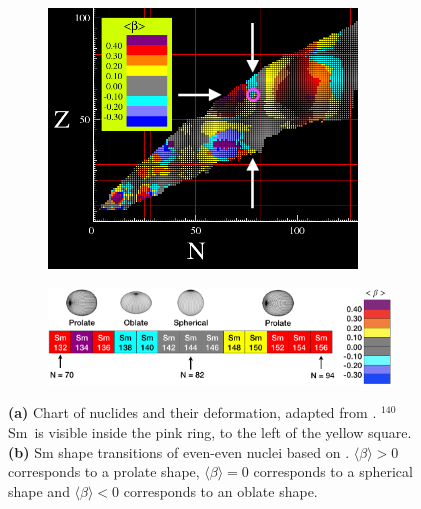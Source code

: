 \documentclass[twoside,english]{uiofysmaster/uiofysmaster}
\newcommand{\Sm}{$^{140}$Sm} %
\begin{document}
\begin{figure}[htb!]
	\centering
	\begin{subfigure}{\textwidth}
		\centering
		\includegraphics[width=0.9\textwidth]{Images/cea-CoN-adjusted.png}
		\caption{}
		\label{fig:cea_CoN}
	\end{subfigure}
	\begin{subfigure}{\textwidth}
		\centering
		\includegraphics[width=\textwidth]{Images/Sm-shapes.png}
		\caption{}
		\label{fig:Sm-shapes}
	\end{subfigure}
	\caption{\textbf{(a)} Chart of nuclides and their deformation, adapted from \cite{Hilaire2007, CEA}. \Sm\ is visible inside the pink ring, to the left of the yellow square.
	 \textbf{(b)} Sm shape transitions of even-even nuclei based on \cite{Hilaire2007, CEA}.
	 $\langle \beta \rangle > 0$ corresponds to a prolate shape, $\langle \beta \rangle = 0$ corresponds to a spherical shape and $\langle \beta \rangle < 0$ corresponds to an oblate shape.}
	\label{fig:deformation}
\end{figure}
\end{document}
